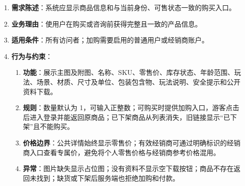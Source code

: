 \begin{enumerate}
\item {\bfseries 需求陈述}：系统应显示商品信息和与当前身份、可售状态一致的购买入口。
\item {\bfseries 业务理由}：使用户在购买或咨询前获得完整且一致的产品信息。
\item {\bfseries 适用条件}：所有访问者；加购需要启用的普通用户或经销商账户。
\item {\bfseries 行为与约束}：
\begin{enumerate}
\item {\bfseries 功能}：展示主图及附图、名称、SKU、零售价、库存状态、年龄范围、玩法、场景、材质、尺寸及单位、包装包含物、玩法说明、安全提示和公开资料下载。
\item {\bfseries 规则}：数量默认为 1，可输入正整数；可购买时提供加购入口，游客点击后进入登录并能返回原商品；已下架商品从列表消失，旧链接显示“已下架”且不能购买。
\item {\bfseries 价格边界}：公共详情始终显示零售价；有效经销商可通过明确标识的经销商入口查看专属价，避免将个人零售价格与经销商参考价格混用。
\item {\bfseries 异常}：图片缺失显示占位图；没有资料不显示空下载按钮；商品不存在返回未找到；缺货或下架后服务端也拒绝加购和付款。
\end{enumerate}

\end{enumerate}


